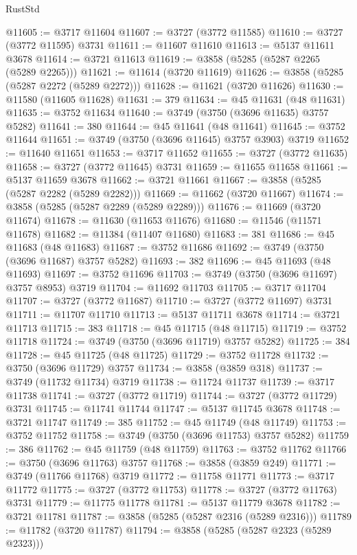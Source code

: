 \begin{lexlean}{RustStd}
\begin{coremodule}
@11605 := @3717 @11604
@11607 := @3727 (@3772 @11585)
@11610 := @3727 (@3772 @11595) @3731
@11611 := @11607 @11610
@11613 := @5137 @11611 @3678
@11614 := @3721 @11613
@11619 := @3858 (@5285 (@5287 @2265 (@5289 @2265)))
@11621 := @11614 (@3720 @11619)
@11626 := @3858 (@5285 (@5287 @2272 (@5289 @2272)))
@11628 := @11621 (@3720 @11626)
@11630 := @11580 (@11605 @11628)
@11631 := 379
@11634 := @45 @11631 (@48 @11631)
@11635 := @3752 @11634
@11640 := @3749 (@3750 (@3696 @11635) @3757 @5282)
@11641 := 380
@11644 := @45 @11641 (@48 @11641)
@11645 := @3752 @11644
@11651 := @3749 (@3750 (@3696 @11645) @3757 @3903) @3719
@11652 := @11640 @11651
@11653 := @3717 @11652
@11655 := @3727 (@3772 @11635)
@11658 := @3727 (@3772 @11645) @3731
@11659 := @11655 @11658
@11661 := @5137 @11659 @3678
@11662 := @3721 @11661
@11667 := @3858 (@5285 (@5287 @2282 (@5289 @2282)))
@11669 := @11662 (@3720 @11667)
@11674 := @3858 (@5285 (@5287 @2289 (@5289 @2289)))
@11676 := @11669 (@3720 @11674)
@11678 := @11630 (@11653 @11676)
@11680 := @11546 (@11571 @11678)
@11682 := @11384 (@11407 @11680)
@11683 := 381
@11686 := @45 @11683 (@48 @11683)
@11687 := @3752 @11686
@11692 := @3749 (@3750 (@3696 @11687) @3757 @5282)
@11693 := 382
@11696 := @45 @11693 (@48 @11693)
@11697 := @3752 @11696
@11703 := @3749 (@3750 (@3696 @11697) @3757 @8953) @3719
@11704 := @11692 @11703
@11705 := @3717 @11704
@11707 := @3727 (@3772 @11687)
@11710 := @3727 (@3772 @11697) @3731
@11711 := @11707 @11710
@11713 := @5137 @11711 @3678
@11714 := @3721 @11713
@11715 := 383
@11718 := @45 @11715 (@48 @11715)
@11719 := @3752 @11718
@11724 := @3749 (@3750 (@3696 @11719) @3757 @5282)
@11725 := 384
@11728 := @45 @11725 (@48 @11725)
@11729 := @3752 @11728
@11732 := @3750 (@3696 @11729) @3757
@11734 := @3858 (@3859 @318)
@11737 := @3749 (@11732 @11734) @3719
@11738 := @11724 @11737
@11739 := @3717 @11738
@11741 := @3727 (@3772 @11719)
@11744 := @3727 (@3772 @11729) @3731
@11745 := @11741 @11744
@11747 := @5137 @11745 @3678
@11748 := @3721 @11747
@11749 := 385
@11752 := @45 @11749 (@48 @11749)
@11753 := @3752 @11752
@11758 := @3749 (@3750 (@3696 @11753) @3757 @5282)
@11759 := 386
@11762 := @45 @11759 (@48 @11759)
@11763 := @3752 @11762
@11766 := @3750 (@3696 @11763) @3757
@11768 := @3858 (@3859 @249)
@11771 := @3749 (@11766 @11768) @3719
@11772 := @11758 @11771
@11773 := @3717 @11772
@11775 := @3727 (@3772 @11753)
@11778 := @3727 (@3772 @11763) @3731
@11779 := @11775 @11778
@11781 := @5137 @11779 @3678
@11782 := @3721 @11781
@11787 := @3858 (@5285 (@5287 @2316 (@5289 @2316)))
@11789 := @11782 (@3720 @11787)
@11794 := @3858 (@5285 (@5287 @2323 (@5289 @2323)))

\end{coremodule}
\end{lexlean}
